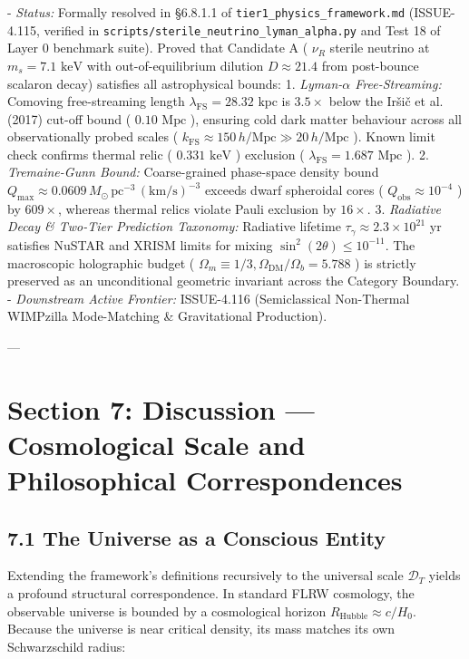 \documentclass[11pt,a4paper]{article}
\theoremstyle{definition}
\theoremstyle{remark}
\begin{document}
- \textit{Status:} Formally resolved in \S 6.8.1.1 of \texttt{tier1_physics_framework.md} (ISSUE-4.115, verified in \texttt{scripts/sterile_neutrino_lyman_alpha.py} and Test 18 of Layer 0 benchmark suite). Proved that Candidate A ( $\nu_R$ sterile neutrino at $m_s = 7.1\text{ keV}$ with out-of-equilibrium dilution $D \approx 21.4$ from post-bounce scalaron decay) satisfies all astrophysical bounds:
1. \textit{Lyman-$\alpha$ Free-Streaming:} Comoving free-streaming length $\lambda_{\text{FS}} = 28.32\text{ kpc}$ is $3.5\times$ below the Iršič et al. (2017) cut-off bound ( $0.10\text{ Mpc}$ ), ensuring cold dark matter behaviour across all observationally probed scales ( $k_{\text{FS}} \approx 150\,h/\text{Mpc} \gg 20\,h/\text{Mpc}$ ). Known limit check confirms thermal relic ( $0.331\text{ keV}$ ) exclusion ( $\lambda_{\text{FS}} = 1.687\text{ Mpc}$ ).
2. \textit{Tremaine-Gunn Bound:} Coarse-grained phase-space density bound $Q_{\text{max}} \approx 0.0609 \, M_\odot \, \text{pc}^{-3} \, (\text{km/s})^{-3}$ exceeds dwarf spheroidal cores ( $Q_{\text{obs}} \approx 10^{-4}$ ) by $609\times$, whereas thermal relics violate Pauli exclusion by $16\times$.
3. \textit{Radiative Decay \& Two-Tier Prediction Taxonomy:} Radiative lifetime $\tau_\gamma \approx 2.3 \times 10^{21}\text{ yr}$ satisfies NuSTAR and XRISM limits for mixing $\sin^2(2\theta) \le 10^{-11}$. The macroscopic holographic budget ( $\Omega_m \equiv 1/3, \Omega_{\text{DM}}/\Omega_b = 5.788$ ) is strictly preserved as an unconditional geometric invariant across the Category Boundary.
- \textit{Downstream Active Frontier:} ISSUE-4.116 (Semiclassical Non-Thermal WIMPzilla Mode-Matching \& Gravitational Production).

---

\section{Section 7: Discussion — Cosmological Scale and Philosophical Correspondences}

\subsection{7.1 The Universe as a Conscious Entity}
Extending the framework's definitions recursively to the universal scale $\mathcal{D}_T$ yields a profound structural correspondence. In standard FLRW cosmology, the observable universe is bounded by a cosmological horizon $R_{\text{Hubble}} \approx c/H_0$. Because the universe is near critical density, its mass matches its own Schwarzschild radius:
\end{document}
